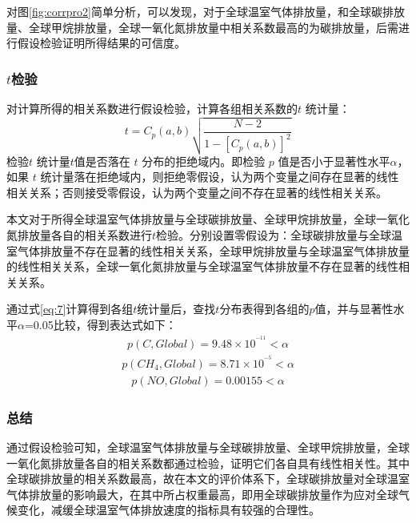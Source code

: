 \documentclass[withoutpreface,bwprint]{cumcmthesis}
\begin{document}
对图\ref{fig:corrpro2}简单分析，可以发现，对于全球温室气体排放量，和全球碳排放量、全球甲烷排放量，全球一氧化氮排放量中相关系数最高的为碳排放量，后需进行假设检验证明所得结果的可信度。
	   
	   
	   
\subsubsection{$t$检验}
	对计算所得的相关系数进行假设检验，计算各组相关系数的$t$ 统计量：
	\begin{equation}
		\label{eq:7}
		t={{C}_{p}}(a,b)\sqrt{\frac{N-2}{1-{{\left [{{{C}_{p}}(a,b)}\right ]}^{2}}}}
	\end{equation}
	检验$t$ 统计量$t$值是否落在 $t$ 分布的拒绝域内。即检验 $p$ 值是否小于显著性水平$\alpha $，如果 $t$ 统计量落在拒绝域内，则拒绝零假设，认为两个变量之间存在显著的线性相关关系；否则接受零假设，认为两个变量之间不存在显著的线性相关关系。
	
	
本文对于所得全球温室气体排放量与全球碳排放量、全球甲烷排放量，全球一氧化氮排放量各自的相关系数进行$t$检验。分别设置零假设为：全球碳排放量与全球温室气体排放量不存在显著的线性相关关系，全球甲烷排放量与全球温室气体排放量的线性相关关系，全球一氧化氮排放量与全球温室气体排放量不存在显著的线性相关关系。
	
	通过式\eqref{eq:7}计算得到各组$t$统计量后，查找$t$分布表得到各组的$p$值，并与显著性水平$\alpha $=0.05比较，得到表达式如下：
	\begin{align*}
		p(C,Global)=9.48 \times {10^{^{ - 11}}}<\alpha
	\end{align*}
	\begin{align*}
		p(CH_4,Global)=8.71 \times {10^{^{ - 5}}}<\alpha
	\end{align*}
	\begin{align*}
		p(NO,Global)=0.00155<\alpha
	\end{align*}
	
	\subsubsection{总结}
	通过假设检验可知，全球温室气体排放量与全球碳排放量、全球甲烷排放量，全球一氧化氮排放量各自的相关系数都通过检验，证明它们各自具有线性相关性。其中全球碳排放量的相关系数最高，故在本文的评价体系下，全球碳排放量对全球温室气体排放量的影响最大，在其中所占权重最高，即用全球碳排放量作为应对全球气候变化，减缓全球温室气体排放速度的指标具有较强的合理性。
	
	
\end{document}
